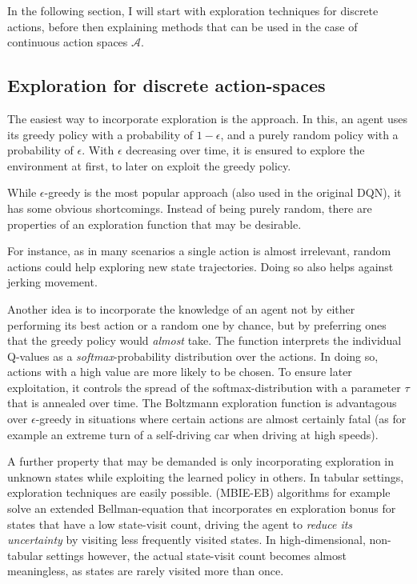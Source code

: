 In the following section, I will start with exploration techniques for discrete actions, before then explaining methods that can be used in the case of continuous action spaces $\mathcal{A}$.



\subsection{Exploration for discrete action-spaces}

The easiest way to incorporate exploration is the  approach. In this, an agent uses its greedy policy with a probability of $1-\epsilon$, and a purely random policy with a probability of $\epsilon$. With $\epsilon$ decreasing over time, it is ensured to explore the environment at first, to later on exploit the greedy policy. 

While $\epsilon$-greedy is the most popular approach (also used in the original DQN), it has some obvious shortcomings. Instead of being purely random, there are properties of an exploration function that may be desirable. 

For instance, as in many scenarios a single action is almost irrelevant,  random actions could help exploring new state trajectories. Doing so also helps against jerking movement. 

Another idea is to incorporate the knowledge of an agent not by either performing its best action or a random one by chance, but by preferring ones that the greedy policy would \textit{almost} take. The  function interprets the individual Q-values as a \textit{softmax}-probability distribution over the actions. In doing so, actions with a high value are more likely to be chosen. To ensure later exploitation, it controls the spread of the softmax-distribution with a parameter $\tau$ that is annealed over time. The Boltzmann exploration function is advantagous over $\epsilon$-greedy in situations where certain actions are almost certainly fatal (as for example an extreme turn of a self-driving car when driving at high speeds).

A further property that may be demanded is only incorporating exploration in unknown states while exploiting the learned policy in others. In tabular settings,  exploration techniques are easily possible.  (MBIE-EB) algorithms for example solve an extended Bellman-equation that incorporates en exploration bonus for states that have a low state-visit count, driving the agent to \textit{reduce its uncertainty} by visiting less frequently visited states. In high-dimensional, non-tabular settings however, the actual state-visit count becomes almost meaningless, as states are rarely visited more than once.

